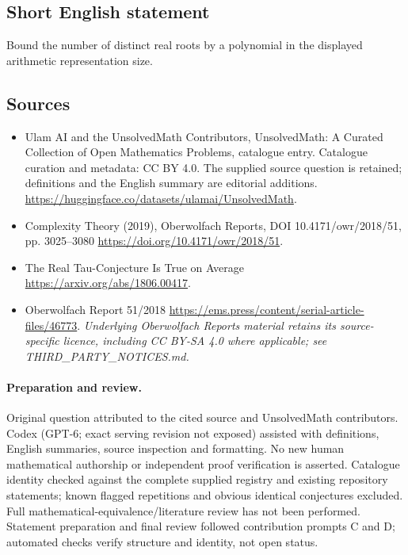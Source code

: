 \documentclass[11pt]{article}
\begin{document}
\subsection{Short English statement}
Bound the number of distinct real roots by a polynomial in the displayed arithmetic representation size.
\subsection{Sources}
\begin{itemize}
\item[\hypertarget{source:statement:1}{S1}] Ulam AI and the UnsolvedMath Contributors, UnsolvedMath: A Curated Collection of Open Mathematics Problems, catalogue entry. Catalogue curation and metadata: CC BY 4.0. The supplied source question is retained; definitions and the English summary are editorial additions.
\url{https://huggingface.co/datasets/ulamai/UnsolvedMath}.
\item[\hypertarget{source:statement:2}{S2}] Complexity Theory (2019), Oberwolfach Reports, DOI 10.4171/owr/2018/51, pp. 3025--3080
\url{https://doi.org/10.4171/owr/2018/51}.
\item[\hypertarget{source:statement:3}{S3}] The Real Tau-Conjecture Is True on Average
\url{https://arxiv.org/abs/1806.00417}.
\item[\hypertarget{source:statement:4}{S4}] Oberwolfach Report 51/2018
\url{https://ems.press/content/serial-article-files/46773}.
\textit{Underlying Oberwolfach Reports material retains its source-specific licence, including CC BY-SA 4.0 where applicable; see THIRD\_PARTY\_NOTICES.md.}
\end{itemize}
\paragraph{Preparation and review.}
Original question attributed to the cited source and UnsolvedMath contributors. Codex (GPT-6; exact serving revision not exposed) assisted with definitions, English summaries, source inspection and formatting. No new human mathematical authorship or independent proof verification is asserted. Catalogue identity checked against the complete supplied registry and existing repository statements; known flagged repetitions and obvious identical conjectures excluded. Full mathematical-equivalence/literature review has not been performed. Statement preparation and final review followed contribution prompts C and D; automated checks verify structure and identity, not open status.
\label{end:statement}
\end{document}
